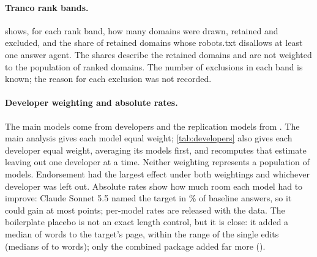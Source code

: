 \paragraph{Tranco rank bands.}  shows, for each rank band, how many domains were drawn, retained
and excluded, and the share of retained domains whose robots.txt disallows at least one answer agent. The shares
describe the retained domains and are not weighted to the population of ranked domains. The number of exclusions in
each band is known; the reason for each exclusion was not recorded.

\begin{table}[htbp]
\centering\small
\caption{Tranco sample by rank band: domains drawn, retained and excluded, and the share of retained domains whose
robots.txt disallows an answer agent (95\% Wilson intervals).}
\label{tab:rankbands}

\end{table}

\paragraph{Developer weighting and absolute rates.} The main models come from \RevNDevelopers{} developers and the
replication models from \RevFlNDevelopers. The main analysis gives each model equal weight; \cref{tab:developers} also
gives each developer equal weight, averaging its models first, and recomputes that estimate leaving out one developer
at a time. Neither weighting represents a population of models. Endorsement had the largest effect under both
weightings and whichever developer was left out. Absolute rates show how much room each model had to improve: Claude
Sonnet 5.5 named the target in \RevSonnetBase\% of baseline answers, so it could gain at most \RevSonnetHeadroom{}
points; per-model rates are released with the data. The boilerplate placebo is not an exact length control, but it is close: it added
a median of \RevPlaceboWords{} words to the target's page, within the range of the single edits (medians of
\RevSingleWordsMin{} to \RevSingleWordsMax{} words); only the combined package added far more (\RevCombinedWords).

\begin{table}[htbp]
\centering\scriptsize
\caption{Absolute mention rates (\%) and paired effects (percentage points) for third-party endorsement, source
citations, statistics and keyword stuffing. Both weightings describe the selected API models, not a population of
models. The last column is the range of the developer-weighted effect when one developer is left out, a sensitivity
analysis rather than a confidence interval.}
\label{tab:developers}
\resizebox{\linewidth}{!}{}
\end{table}

